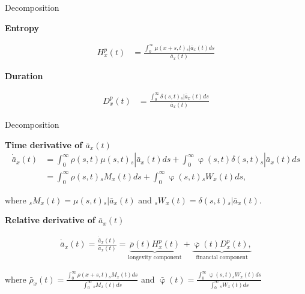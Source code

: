 \documentclass[10pt]{beamer}
\begin{document}
\begin{frame}{Decomposition}



\textbf{Entropy}

\begin{equation} \label{eq:EntropyP2}
\begin{split}
{H}^{p}_{x}(t) &=  \frac{\int_0^\infty \mu(x+s,t)   {}_s|\bar{a}_x(t) ds}{\bar{a}_x(t)} 
\end{split}
\end{equation}

\textbf{Duration}

\begin{equation}\label{eq:DurationP2}
\begin{split}
{D}^{p}_{x}(t) &= \frac{\int_0^\infty \delta(s,t) {}_s|\bar{a}_x(t)ds} {\bar{a}_x(t)} 
\end{split}
\end{equation}

\end{frame}

\begin{frame}{Decomposition}

\textbf{Time derivative of $\bar{a}_{x}(t)$ }
\begin{equation}\nonumber
\begin{split}
\dot{\bar{a}}_{x}(t) &=  \int_0^\infty \rho(s,t) \mu(s,t){}_s|\bar{a}_x(t) ds +\int_0^\infty  \upvarphi(s,t) \delta(s,t)  {}_s|\bar{a}_x(t) ds\\
&= \int_0^\infty \rho(s,t) {}_sM_x(t)  ds +\int_0^\infty  \upvarphi(s,t) {}_sW_x(t)  ds,
\end{split}
\end{equation}


where ${}_sM_x(t)= \mu(s,t){}_s|\bar{a}_x(t)$ and ${}_sW_x(t)=\delta(s,t)  {}_s|\bar{a}_x(t)$.

\textbf{Relative derivative of $\bar{a}_{x}(t)$ }

\begin{equation}\nonumber
\begin{split}
\acute{\bar{a}}_x(t) = \frac{\dot{\bar{a}}_x(t)}{\bar{a}_x(t)}  = 
\underbrace{\bar{\rho}(t){H}^{p}_x(t)}_\text{longevity component}
+\underbrace{\bar{\upvarphi}(t){D}^{p}_x(t),}_\text{financial component}
\end{split}
\end{equation}


where $\bar{\rho}_x(t)= \frac{\int_0^\infty \rho(x+s,t) {}_sM_x(t)  ds}{\int_0^\infty  {}_sM_x(t)ds}$ and $\bar{\upvarphi}(t)= \frac{\int_0^\infty \upvarphi(s,t) {}_sW_x(t)  ds}{\int_0^\infty {}_sW_x(t) ds}$ 

\end{frame}
\end{document}

